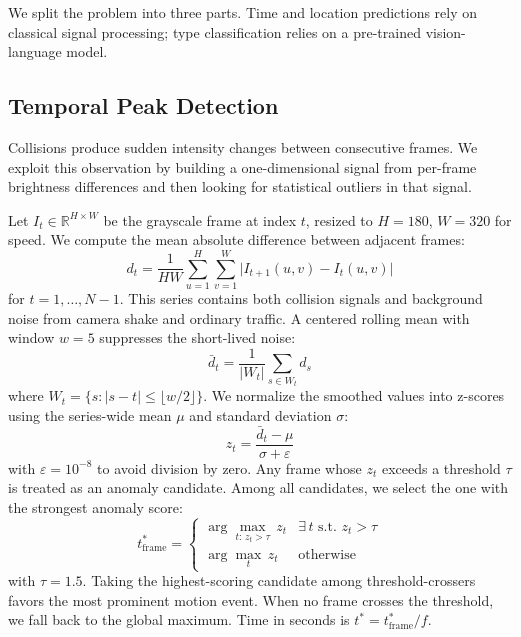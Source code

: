 \documentclass{article}
\begin{document}
We split the problem into three parts. Time and location predictions rely on classical signal processing; type classification relies on a pre-trained vision-language model.

\subsection{Temporal Peak Detection}

Collisions produce sudden intensity changes between consecutive frames. We exploit this observation by building a one-dimensional signal from per-frame brightness differences and then looking for statistical outliers in that signal.

Let $I_t \in \mathbb{R}^{H \times W}$ be the grayscale frame at index $t$, resized to $H = 180$, $W = 320$ for speed. We compute the mean absolute difference between adjacent frames:
\begin{equation}
    d_t = \frac{1}{HW} \sum_{u=1}^{H} \sum_{v=1}^{W} \big| I_{t+1}(u,v) - I_t(u,v) \big|
    \label{eq:framediff}
\end{equation}
for $t = 1, \ldots, N{-}1$. This series contains both collision signals and background noise from camera shake and ordinary traffic. A centered rolling mean with window $w = 5$ suppresses the short-lived noise:
\begin{equation}
    \bar{d}_t = \frac{1}{|W_t|} \sum_{s \in W_t} d_s
    \label{eq:smooth}
\end{equation}
where $W_t = \{s : |s - t| \leq \lfloor w/2 \rfloor\}$. We normalize the smoothed values into z-scores using the series-wide mean $\mu$ and standard deviation $\sigma$:
\begin{equation}
    z_t = \frac{\bar{d}_t - \mu}{\sigma + \varepsilon}
    \label{eq:zscore}
\end{equation}
with $\varepsilon = 10^{-8}$ to avoid division by zero. Any frame whose $z_t$ exceeds a threshold $\tau$ is treated as an anomaly candidate. Among all candidates, we select the one with the strongest anomaly score:
\begin{equation}
    t^{*}_{\text{frame}} =
    \begin{cases}
        \arg\max_{t :\, z_t > \tau}\, z_t & \exists\, t \text{ s.t. } z_t > \tau \\
        \arg\max_t\, z_t & \text{otherwise}
    \end{cases}
    \label{eq:peak}
\end{equation}
with $\tau = 1.5$. Taking the highest-scoring candidate among threshold-crossers favors the most prominent motion event. When no frame crosses the threshold, we fall back to the global maximum. Time in seconds is $t^{*} = t^{*}_{\text{frame}} / f$.
\end{document}
